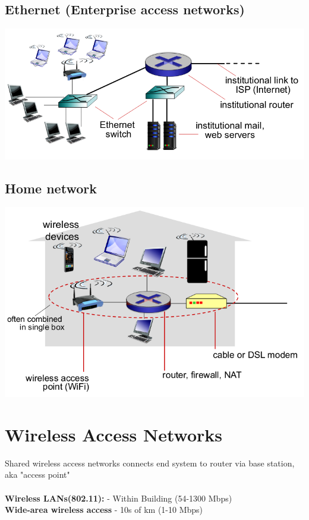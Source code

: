 \documentclass{article}[18pt]
\begin{document}
\subsection{Ethernet (Enterprise access networks)}
\begin{center}
	\includegraphics[scale=0.7]{Ethernet}
\end{center}
\subsection{Home network}
\begin{center}
	\includegraphics[scale=0.7]{"Home Network"}
\end{center}

\section{Wireless Access Networks}
Shared wireless access networks connects end system to router via base station, aka "access point"\\
\\
\textbf{Wireless LANs(802.11):} - Within Building (54-1300 Mbps)\\
\textbf{Wide-area wireless access} - 10s of km (1-10 Mbps)
\end{document}
